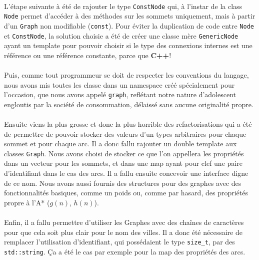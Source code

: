 \documentclass[french]{article}
\begin{document}
\paragraph{} L'étape suivante à été de rajouter le type \texttt{ConstNode} qui,
à l'instar de la class \texttt{Node} permet d'accéder à des méthodes sur les
sommets uniquement, mais à partir d'un \texttt{Graph} non modifiable
(\texttt{const}). Pour éviter la duplication de code entre
\texttt{Node} et \texttt{ConstNode}, la solution choisie a été de créer une
classe mère \texttt{GenericNode} ayant un template pour pouvoir choisir si le
type des connexions internes est une référence ou une référence constante,
parce que \textbf{C++}!

\paragraph{} Puis, comme tout programmeur se doit de respecter les conventions
du langage, nous avons mis toutes les classe dans un namespace créé
spécialement pour l'occasion, que nous avons appelé \texttt{graph}, reflétant
notre nature d'adolescent engloutis par la société de consommation, délaissé
sans aucune originalité propre.

\paragraph{} Ensuite viens la plus grosse et donc la plus horrible des
refactorisations qui a été de permettre de pouvoir stocker des valeurs d'un
types arbitraires pour chaque sommet et pour chaque arc. Il a donc fallu
rajouter un double template aux classes \texttt{Graph}. Nous avons choisi de
stocker ce que l'on appellera les propriétés dans un vecteur pour les sommets,
et dans une map ayant pour clef une paire d'identifiant dans le cas des arcs.
Il a fallu ensuite concevoir une interface digne de ce nom. Nous avons aussi
fournis des structures pour des graphes avec des fonctionnalités basiques,
comme un poids ou, comme par hasard, des propriétés propre à l'A* ($g(n)$,
$h(n)$).

\paragraph{} Enfin, il a fallu permettre d'utiliser les Graphes avec des
chaînes de caractères pour que cela soit plus clair pour le nom des villes. Il
a donc été nécessaire de remplacer l'utilisation d'identifiant, qui possédaient
le type \texttt{size_t}, par des \texttt{std::string}. Ça a
été le cas par exemple pour la map des propriétés des arcs.
\end{document}
